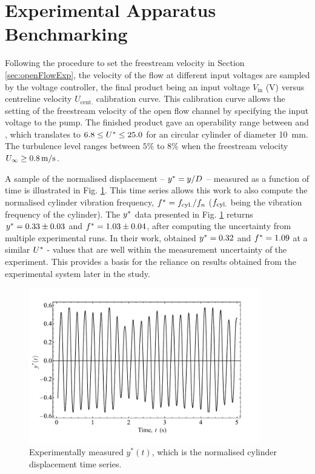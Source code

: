 \documentclass[oneside]{utmthesis}
\begin{document}
\section{Experimental Apparatus Benchmarking} \label{sec:appBenchmark}

\vspace{\baselineskip}

 Following the procedure to set the freestream velocity in Section \ref{sec:openFlowExp}, the velocity of the flow at different input voltages are sampled by the voltage controller, the final product being an input voltage $V_{\text{in}}$ (V) versus centreline velocity $U_{\text{cent.}}$ calibration curve. This calibration curve allows the setting of the freestream velocity of the open flow channel by specifying the input voltage to the pump. The finished product gave an operability range between \uth{} and \uel{}, which translates to $6.8 \leq U^{*} \leq 25.0$ for an circular cylinder of diameter \SI{10}{\milli\metre}. The turbulence level ranges between $5\%$ to $8\%$ when the freestream velocity $U_{\infty} \geq \uei$.

 A sample of the normalised displacement -- $y^{*} = y/D$ -- measured as a function of time is illustrated in Fig. \ref{fig:sampTimeHist}. This time series allows this work to also compute the normalised cylinder vibration frequency, $f^{*} = f_{\text{cyl.}}/f_{n}$ ($f_{\text{cyl.}}$ being the vibration frequency of the cylinder). The $y^{*}$ data presented in Fig. \ref{fig:sampTimeHist} returns $y^{*} = 0.33 \pm 0.03$ and $f^{*} = 1.03 \pm 0.04$, after computing the uncertainty from multiple experimental runs. In their work, \citet{Koide2013} obtained $y^{*} = 0.32$ and $f^{*} = 1.09$ at a similar $U^{*}$ - values that are well within the measurement uncertainty of the experiment. This provides a basis for the reliance on results obtained from the experimental system later in the study.

\begin{figure}[!h]
  \centering
  \includegraphics[width=0.9\textwidth]{figs/figure5}
  \caption{Experimentally measured $y^{*}(t)$, which is the normalised cylinder displacement time series.}
  \label{fig:sampTimeHist}
\end{figure}
\end{document}
